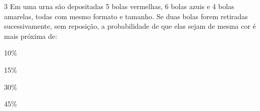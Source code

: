 \num{3} Em uma urna são depositadas 5 bolas vermelhas, 6 bolas azuis e 4 bolas
amarelas, todas com mesmo formato e tamanho. Se duas bolas forem
retiradas sucessivamente, sem reposição, a probabilidade de que elas
sejam de mesma cor é mais próxima de:

\begin{escolha}

  \item 10\%

  \item 15\%

  \item 30\%

  \item 45\%

\end{escolha}







